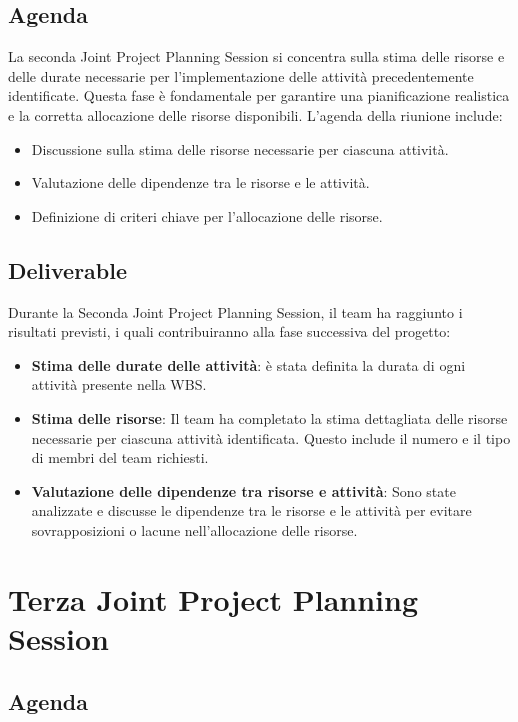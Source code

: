 \subsection{Agenda}

La seconda Joint Project Planning Session si concentra sulla stima delle risorse e delle durate necessarie per l'implementazione delle attività precedentemente identificate. Questa fase è fondamentale per garantire una pianificazione realistica e la corretta allocazione delle risorse disponibili. L'agenda della riunione include:

\begin{itemize}
    \item Discussione sulla stima delle risorse necessarie per ciascuna attività.
    \item Valutazione delle dipendenze tra le risorse e le attività.
    \item Definizione di criteri chiave per l'allocazione delle risorse.
\end{itemize}

\subsection{Deliverable}

Durante la Seconda Joint Project Planning Session, il team ha raggiunto i risultati previsti, i quali contribuiranno alla fase successiva del progetto:

\begin{itemize}
    \item \textbf{Stima delle durate delle attività}: è stata definita la durata di ogni attività presente nella WBS.
    \item \textbf{Stima delle risorse}: Il team ha completato la stima dettagliata delle risorse necessarie per ciascuna attività identificata. Questo include il numero e il tipo di membri del team richiesti.
    \item \textbf{Valutazione delle dipendenze tra risorse e attività}: Sono state analizzate e discusse le dipendenze tra le risorse e le attività per evitare sovrapposizioni o lacune nell'allocazione delle risorse.
\end{itemize}

\section{Terza Joint Project Planning Session}

\subsection{Agenda}

